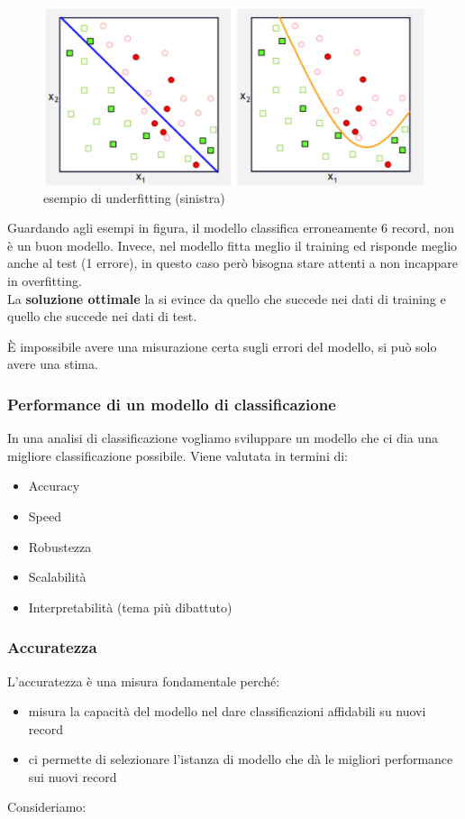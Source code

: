 \begin{figure}[H]
	\centering
	\includegraphics[height=0.3 \linewidth]{classification/pict/underfitting_merge.png}
	\caption{esempio di underfitting (sinistra)}
\end{figure}
Guardando agli esempi in figura, il modello {\color{blue}{blu}} classifica erroneamente 6 record, non è un buon modello. Invece, nel modello {\color{orange}{arancione}} fitta meglio il training ed risponde meglio anche al test (1 errore), in questo caso però bisogna stare attenti a non incappare in overfitting.\\
 
La \textbf{soluzione ottimale} la si evince da quello che succede nei dati di training e quello che succede nei dati di test.

\`E impossibile avere una misurazione certa sugli errori del modello, si pu\`o solo avere una stima. 

\subsubsection{Performance di un modello di classificazione}

In una analisi di classificazione vogliamo sviluppare un modello che ci dia una migliore classificazione possibile. Viene valutata in termini di:
\begin{itemize}
	\item Accuracy
	\item Speed
	\item Robustezza
	\item Scalabilità
	\item Interpretabilità (tema più dibattuto)
\end{itemize}

\subsubsection{Accuratezza}
L'accuratezza è una misura fondamentale perché: 
\begin{itemize}
	\item misura la capacità del modello nel dare classificazioni affidabili su nuovi record
	\item ci permette di selezionare l'istanza di modello che d\`a le migliori performance sui nuovi record
\end{itemize}
Consideriamo:

